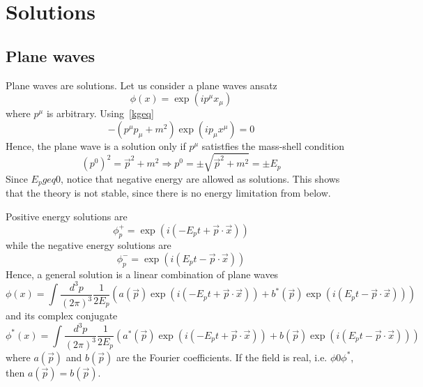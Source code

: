 \chapter{Solutions}

\section{Plane waves}

    Plane waves are solutions. Let us consider a plane waves ansatz 
    \begin{equation*}
        \phi(x) = \exp(i p^\mu x_\mu)
    \end{equation*}
    where $p^\mu$ is arbitrary. Using~\eqref{kgeq}
    \begin{equation*}
        - (p^\mu p_\mu + m^2) \exp(i p_\mu x^\mu) = 0
    \end{equation*}
    Hence, the plane wave is a solution only if $p^\mu$ satistfies the mass-shell condition 
    \begin{equation*}
        (p^0)^2 = \vec p^2 + m^2 \Rightarrow p^0 = \pm \sqrt{\vec p^2 + m^2} = \pm E_p
    \end{equation*}
    Since $E_p geq 0$, notice that negative energy are allowed as solutions. This shows that the theory is not stable, since there is no energy limitation from below.

    Positive energy solutions are  
    \begin{equation*}
        \phi^+_p = \exp(i(-E_p t + \vec p \cdot \vec x))
    \end{equation*}
    while the negative energy solutions are 
    \begin{equation*}
        \phi^-_p = \exp(i(E_p t - \vec p \cdot \vec x))
    \end{equation*}
    Hence, a general solution is a linear combination of plane waves 
    \begin{equation*}
        \phi (x) = \int \frac{d^3 p}{(2 \pi)^3} \frac{1}{2 E_p} (a(\vec p) \exp(i(-E_p t + \vec p \cdot \vec x)) + b^*(\vec p) \exp(i(E_p t - \vec p \cdot \vec x)))
    \end{equation*}
    and its complex conjugate
    \begin{equation*}
        \phi^* (x) = \int \frac{d^3 p}{(2 \pi)^3} \frac{1}{2 E_p} (a^* (\vec p) \exp(i(-E_p t + \vec p \cdot \vec x)) + b(\vec p) \exp(i(E_p t - \vec p \cdot \vec x)))
    \end{equation*}
    where $a(\vec p)$ and $b(\vec p)$ are the Fourier coefficients. If the field is real, i.e. $\phi 0 \phi^*$, then $a(\vec p) = b(\vec p)$.


